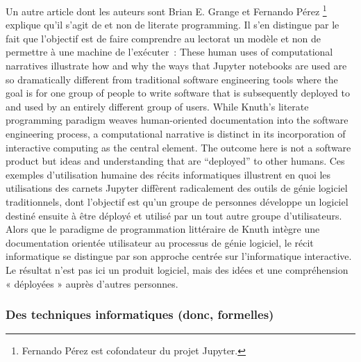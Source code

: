 {Un autre article dont les auteurs sont Brian E. Grange et Fernando Pérez \footnote{Fernando Pérez est cofondateur du projet Jupyter.} explique qu'il s'agit de  et non de literate programming. Il s'en distingue par le fait que l'objectif est de faire comprendre au lectorat un modèle et non de permettre à une machine de l'exécuter~:
\quoteenfr
{These human uses of computational narratives illustrate how and why the ways that Jupyter notebooks are used are so dramatically different from traditional software engineering tools where the goal is for one group of people to write software that is subsequently deployed to and used by an entirely different group of users. While Knuth’s literate programming paradigm weaves human-oriented documentation into the software engineering process, a computational narrative is distinct in its incorporation of interactive computing as the central element. The outcome here is not a software product but ideas and understanding that are “deployed” to other humans.}
{Ces exemples d'utilisation humaine des récits informatiques illustrent en quoi les utilisations des carnets Jupyter diffèrent radicalement des outils de génie logiciel traditionnels, dont l'objectif est qu'un groupe de personnes développe un logiciel destiné ensuite à être déployé et utilisé par un tout autre groupe d'utilisateurs. Alors que le paradigme de programmation littéraire de Knuth intègre une documentation orientée utilisateur au processus de génie logiciel, le récit informatique se distingue par son approche centrée sur l'informatique interactive. Le résultat n'est pas ici un produit logiciel, mais des idées et une compréhension « déployées » auprès d'autres personnes.}
{\cite{granger_jupyter_2021}}
\vspace{-1\baselineskip}
}{}

\subsubsection{Des techniques informatiques (donc, formelles)}


